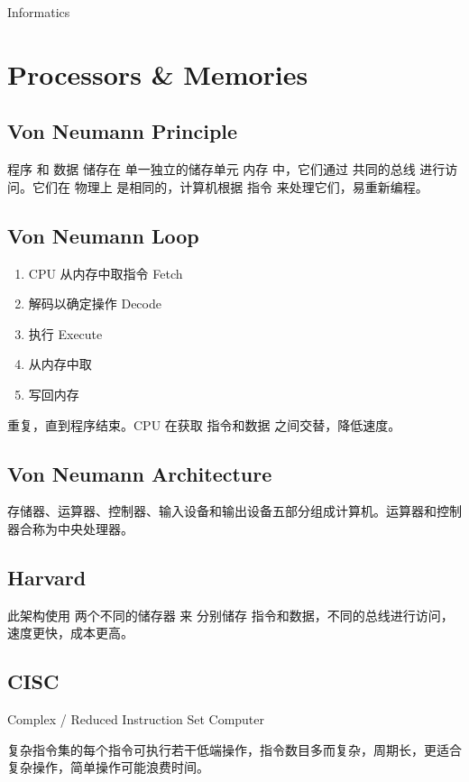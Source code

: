 \documentclass[11pt,journal,compsoc]{IEEEtran}
\begin{document}
Informatics


\section{Processors \& Memories}


\subsection{Von Neumann Principle}

程序 和 数据 储存在 单一独立的储存单元 内存 中，它们通过 共同的总线 进行访问。它们在 物理上 是相同的，计算机根据 指令 来处理它们，易重新编程。


\subsection{Von Neumann Loop}

\begin{enumerate}
    \item CPU 从内存中取指令 Fetch
    \item 解码以确定操作 Decode
    \item 执行 Execute
    \item 从内存中取
    \item 写回内存
\end{enumerate}

重复，直到程序结束。CPU 在获取 指令和数据 之间交替，降低速度。


\subsection{Von Neumann Architecture}

存储器、运算器、控制器、输入设备和输出设备五部分组成计算机。运算器和控制器合称为中央处理器。


\subsection{Harvard}

此架构使用 两个不同的储存器 来 分别储存 指令和数据，不同的总线进行访问，速度更快，成本更高。


\subsection{CISC}

Complex / Reduced Instruction Set Computer

复杂指令集的每个指令可执行若干低端操作，指令数目多而复杂，周期长，更适合复杂操作，简单操作可能浪费时间。
\end{document}
